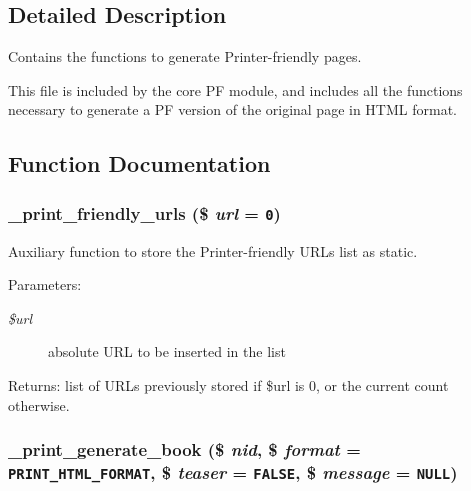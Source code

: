 \subsection{Detailed Description}
Contains the functions to generate Printer-friendly pages.

This file is included by the core PF module, and includes all the functions necessary to generate a PF version of the original page in HTML format. 

\subsection{Function Documentation}
\hypertarget{print_8pages_8inc_8bee3b0f76672324086e88fe6e7c8276}{
\subsubsection[{\_\-print\_\-friendly\_\-urls}]{\setlength{\rightskip}{0pt plus 5cm}\_\-print\_\-friendly\_\-urls (\$ {\em url} = {\tt 0})}}
\label{print_8pages_8inc_8bee3b0f76672324086e88fe6e7c8276}


Auxiliary function to store the Printer-friendly URLs list as static.

\begin{Desc}
\item[Parameters:]
\begin{description}
\item[{\em \$url}]absolute URL to be inserted in the list \end{description}
\end{Desc}
\begin{Desc}
\item[Returns:]list of URLs previously stored if \$url is 0, or the current count otherwise. \end{Desc}
\hypertarget{print_8pages_8inc_6081aae9c9ef906ea6d53fd2eaf3e97c}{
\subsubsection[{\_\-print\_\-generate\_\-book}]{\setlength{\rightskip}{0pt plus 5cm}\_\-print\_\-generate\_\-book (\$ {\em nid}, \/  \$ {\em format} = {\tt PRINT\_\-HTML\_\-FORMAT}, \/  \$ {\em teaser} = {\tt FALSE}, \/  \$ {\em message} = {\tt NULL})}}
\label{print_8pages_8inc_6081aae9c9ef906ea6d53fd2eaf3e97c}


